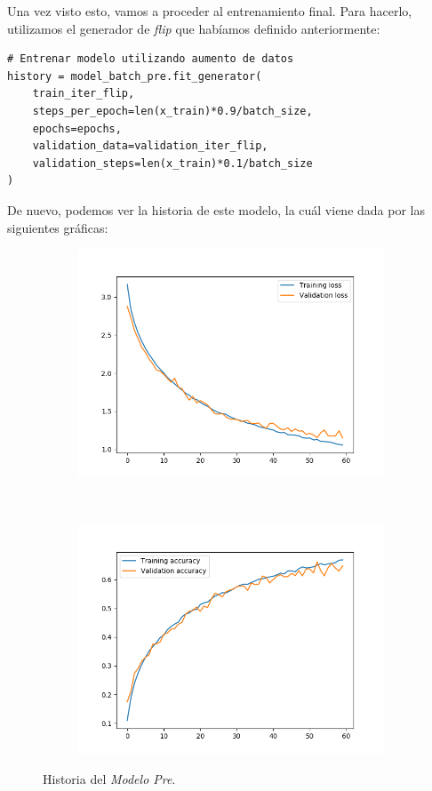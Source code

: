 \documentclass[11pt,a4paper]{article}
\begin{document}
Una vez visto esto, vamos a proceder al entrenamiento final. Para hacerlo, utilizamos el generador
de \textit{flip} que habíamos definido anteriormente:

\begin{lstlisting}
# Entrenar modelo utilizando aumento de datos
history = model_batch_pre.fit_generator(
    train_iter_flip,
    steps_per_epoch=len(x_train)*0.9/batch_size,
    epochs=epochs,
    validation_data=validation_iter_flip,
    validation_steps=len(x_train)*0.1/batch_size
)
\end{lstlisting}

De nuevo, podemos ver la historia de este modelo, la cuál viene dada por las siguientes gráficas:

\begin{figure}[H]
  \centering
  \begin{subfigure}{.5\textwidth}
    \includegraphics[scale=0.4]{img/final-loss.png}
    \label{fig:final-loss}
  \end{subfigure}%
  ~ \quad
  \begin{subfigure}{.5\textwidth}
    \includegraphics[scale=0.4]{img/final-acc.png}
    \label{fig:final-acc}
  \end{subfigure}
  \caption{Historia del \textit{Modelo Pre}.}
  \label{fig:history-final}
\end{figure}
\end{document}
